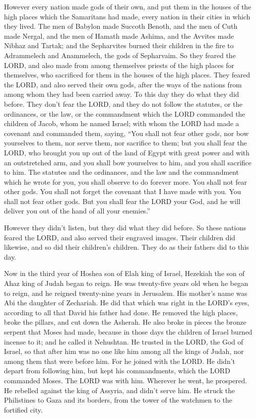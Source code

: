 \myverse{}However every nation made gods of their own, and put them in
the houses of the high places which the Samaritans had made, every nation in their cities in which they
lived.
\myverse{}The men of Babylon made Succoth Benoth, and the men of Cuth made Nergal,
and the men of Hamath made Ashima,
\myverse{}and the Avvites made Nibhaz and Tartak; and the Sepharvites burned their
children in the fire to Adrammelech and Anammelech, the gods of Sepharvaim.
\myverse{}So they feared the LORD, and also made from among themselves priests of the
high places for themselves, who sacrificed for them in the houses of the high places.
\myverse{}They feared the LORD, and also served their own gods, after the ways of the
nations from among whom they had been carried away.
\myverse{}To this day they do what they did before. They don’t fear the LORD, and they
do not follow the statutes, or the ordinances, or the law, or the commandment which the LORD commanded
the children of Jacob, whom he named Israel;
\myverse{}with whom the LORD had made a covenant and commanded them, saying, “You shall
not fear other gods, nor bow yourselves to them, nor serve them, nor sacrifice to them;
\myverse{}but you shall fear the LORD, who brought you up out of the land of Egypt
with great power and with an outstretched arm, and you shall bow yourselves to him, and you shall sacrifice
to him.
\myverse{}The statutes and the ordinances, and the law and the commandment which he
wrote for you, you shall observe to do forever more. You shall not fear other gods.
\myverse{}You shall not forget the covenant that I have made with you. You shall not
fear other gods.
\myverse{}But you shall fear the LORD your God, and he will deliver you out of the
hand of all your enemies.”

\myverse{}However they didn’t listen, but they did what they did before.
\myverse{}So these nations feared the LORD, and also served their engraved images.
Their children did likewise, and so did their children’s children. They do as their fathers did to this
day.


\mychapter{} \myverse*{}Now in the third year of Hoshea son of Elah king of Israel, Hezekiah
the son of Ahaz king of Judah began to reign.
\myverse{}He was twenty-five years old when he began to reign, and he reigned twenty-nine
years in Jerusalem. His mother’s name was Abi the daughter of Zechariah.
\myverse{}He did that which was right in the LORD’s eyes, according to all that David
his father had done.
\myverse{}He removed the high places, broke the pillars, and cut down the Asherah. He
also broke in pieces the bronze serpent that Moses had made, because in those days the children of Israel
burned incense to it; and he called it Nehushtan.
\myverse{}He trusted in the LORD, the God of Israel, so that after him was no one like
him among all the kings of Judah, nor among them that were before him.
\myverse{}For he joined with the LORD. He didn’t depart from following him, but kept
his commandments, which the LORD commanded Moses.
\myverse{}The LORD was with him. Wherever he went, he prospered. He rebelled against
the king of Assyria, and didn’t serve him.
\myverse{}He struck the Philistines to Gaza and its borders, from the tower of the watchmen
to the fortified city.

